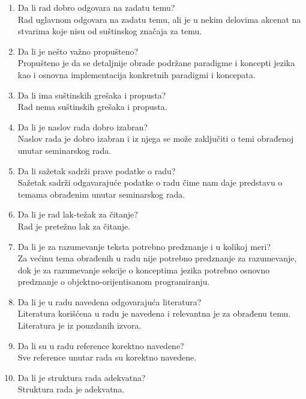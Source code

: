 \documentclass[a4paper]{report}
\begin{document}
\begin{enumerate}
\item Da li rad dobro odgovara na zadatu temu?\\
Rad uglavnom odgovara na zadatu temu, ali je u nekim delovima akcenat na stvarima koje nisu od suštinskog značaja za temu.

\item Da li je nešto važno propušteno?\\
Propušteno je da se detaljnije obrade podržane paradigme i koncepti jezika kao i osnovna implementacija konkretnih paradigmi i koncepata.

\item Da li ima suštinskih grešaka i propusta?\\
Rad nema suštinskih grešaka i propusta.

\item Da li je naslov rada dobro izabran?\\
Naslov rada je  dobro izabran i iz njega se može zaključiti o temi obrađenoj unutar seminarskog rada.

\item Da li sažetak sadrži prave podatke o radu?\\
Sažetak sadrži odgavarajuće podatke o radu čime nam daje predstavu o temama obrađenim unutar seminarskog rada.

\item Da li je rad lak-težak za čitanje?\\
Rad je pretežno lak za čitanje.

\item Da li je za razumevanje teksta potrebno predznanje i u kolikoj meri?\\
Za većinu tema obrađenih u radu nije potrebno predznanje za razumevanje, dok je za razumevanje sekcije o konceptima jezika potrebno osnovno predznanje o objektno-orijentisanom programiranju.
 
\item Da li je u radu navedena odgovarajuća literatura?\\
Literatura korišćena u radu je navedena i relevantna je za obrađenu temu. Literatura je iz pouzdanih izvora.

\item Da li su u radu reference korektno navedene?\\
Sve reference unutar rada su korektno navedene.

\item Da li je struktura rada adekvatna?\\
Struktura rada je adekvatna.


\end{enumerate}
\end{document}
